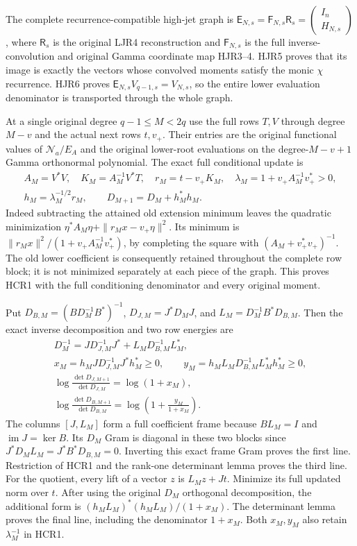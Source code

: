 \documentclass[11pt,a4paper]{article}
\begin{document}
The complete recurrence-compatible high-jet graph is
$\mathsf E_{N,s}=\mathsf F_{N,s}\mathsf R_s
=\begin{pmatrix}I_n\\ H_{N,s}\end{pmatrix}$,
where $\mathsf R_s$ is the original LJR4 reconstruction and
$\mathsf F_{N,s}$ is the full inverse-convolution and original
Gamma coordinate map HJR3--4. HJR5 proves that its image is
exactly the vectors whose convolved moments satisfy the monic
$\chi$ recurrence. HJR6 proves
$\mathsf E_{N,s}V_{q-1,s}=V_{N,s}$, so the entire lower
evaluation denominator is transported through the whole graph.

At a single original degree $q-1\le M<2q$ use the full rows
$T,V$ through degree $M-v$ and the actual next rows $t,v_+$.
Their entries are the original functional values of
$\mathcal N_a/E_A$ and the original lower-root evaluations
on the degree-$M-v+1$ Gamma orthonormal polynomial.
The exact full conditional update is
\[
\begin{gathered}
 A_M=V^*V,\quad K_M=A_M^{-1}V^*T,\quad
 r_M=t-v_+K_M,\quad \lambda_M=1+v_+A_M^{-1}v_+^*>0,\\
 h_M=\lambda_M^{-1/2}r_M,\qquad
 D_{M+1}=D_M+h_M^*h_M .
\end{gathered}\tag{HCR1}
\]
Indeed subtracting the attained old extension minimum leaves
the quadratic minimization
$\eta^*A_M\eta+\|r_Mx-v_+\eta\|^2$.
Its minimum is
$\|r_Mx\|^2/(1+v_+A_M^{-1}v_+^*)$, by completing the square
with $(A_M+v_+^*v_+)^{-1}$.
The old lower coefficient is consequently retained throughout
the complete row block; it is not minimized separately at
each piece of the graph. This proves HCR1 with the full
conditioning denominator and every original moment.

Put
$D_{B,M}=(BD_M^{-1}B^*)^{-1}$,
$D_{J,M}=J^*D_MJ$, and
$L_M=D_M^{-1}B^*D_{B,M}$.
Then the exact inverse decomposition and two row energies are
\[
\begin{gathered}
 D_M^{-1}=J D_{J,M}^{-1}J^*
                  +L_M D_{B,M}^{-1}L_M^*,\\
 x_M=h_MJ D_{J,M}^{-1}J^*h_M^*\ge0,\qquad
 y_M=h_ML_M D_{B,M}^{-1}L_M^*h_M^*\ge0,\\
 \log\frac{\det D_{J,M+1}}{\det D_{J,M}}=\log(1+x_M),\\
 \log\frac{\det D_{B,M+1}}{\det D_{B,M}}
                 =\log\left(1+\frac{y_M}{1+x_M}\right).
\end{gathered}\tag{HCR2}
\]
The columns $[J,L_M]$ form a full coefficient frame because
$BL_M=I$ and $\operatorname{im}J=\ker B$.
Its $D_M$ Gram is diagonal in these two blocks since
$J^*D_ML_M=J^*B^*D_{B,M}=0$.
Inverting this exact frame Gram proves the first line.
Restriction of HCR1 and the rank-one determinant lemma proves
the third line. For the quotient, every lift of a vector $z$
is $L_Mz+Jt$. Minimize its full updated norm over $t$.
After using the original $D_M$ orthogonal decomposition, the
additional form is
$(h_ML_M)^*(h_ML_M)/(1+x_M)$.
The determinant lemma proves the final line, including the
denominator $1+x_M$. Both $x_M,y_M$ also retain
$\lambda_M^{-1}$ in HCR1.
\end{document}
